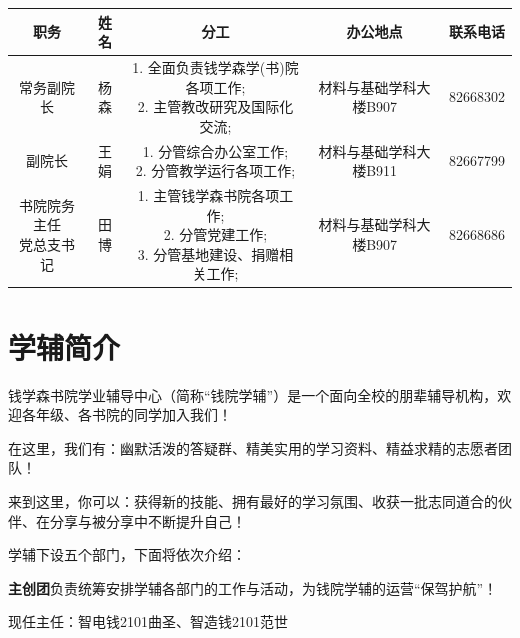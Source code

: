 \documentclass[
decoration,  %
]{qyxf-book}
\newcommand{\Noto}{\CJKfamily{zhsong}}
\begin{document}

	\begin{table}[h]
	\small %
	\begin{tabular}{ | c | c | c | c | c |}
		\hline
		职务 & 姓名 & 分工 & 办公地点 & 联系电话 \\
		\hline
		常务副院长 & 杨森 & \makecell{1. 全面负责钱学森学(书)院各项工作;\\2. 主管教改研究及国际化交流;} & 材料与基础学科大楼B907 & 82668302 \\
		\hline
		副院长 & 王娟 & \makecell{1. 分管综合办公室工作;\\2. 分管教学运行各项工作;} & 材料与基础学科大楼B911 & 82667799 \\
		\hline
		\makecell{书院院务主任\\党总支书记} & 田博 & \makecell{1. 主管钱学森书院各项工作;\\2. 分管党建工作;\\3. 分管基地建设、捐赠相关工作;} & 材料与基础学科大楼B907 & 82668686 \\
		\hline
	  \end{tabular}
	\end{table}

	
	\section{学辅简介}
	钱学森书院学业辅导中心（简称“钱院学辅”）是一个面向全校的朋辈辅导机构，欢迎各年级、各书院的同学加入我们！
	
	在这里，我们有：幽默活泼的答疑群、精美实用的学习资料、精益求精的志愿者团队！
	
	来到这里，你可以：获得新的技能、拥有最好的学习氛围、收获一批志同道合的伙伴、在分享与被分享中不断提升自己！
	
	学辅下设五个部门，下面将依次介绍：
	
	\textbf{主创团}负责统筹安排学辅各部门的工作与活动，为钱院学辅的运营“保驾护航”！
	
	现任主任：智电钱2101曲圣、智造钱2101范世\Noto{祎}
	
\end{document}
